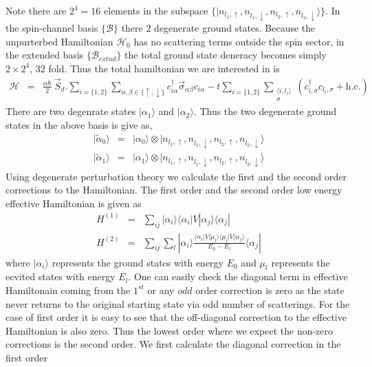 \documentclass[reprint,prb,superscriptaddress]{revtex4-1}
\begin{document}
Note there are $2^4=16$ elements in the subspace $\{|n_{l_1,\uparrow},n_{l_1,\downarrow},n_{l_2,\uparrow},n_{l_2,\downarrow}\rangle\}$. In the spin-channel basis $\{\mathcal{B}\}$ there $2$ degenerate ground states. Because the unpurterbed Hamiltonian $\mathcal{H}_0$ has no scattering terms outside the spin sector, in the extended basis $\{\mathcal{B}_{extnd}\}$ the total ground state deneracy becomes simply $2\times 2^4$, $32$ fold. Thus the total hamiltonian we are interested in is 
\begin{eqnarray}
\mathcal{H} &=& \frac{\alpha\hbar}{2}~ \vec{S}_d. \displaystyle\sum_{i=\{1,2\}} \displaystyle\sum_{\alpha,\beta\in\{\uparrow,\downarrow\}}c_{i\alpha}^{\dagger} \vec{\sigma}_{\alpha\beta} c_{i\alpha} -t\displaystyle\sum_{i=\{1,2\}}\displaystyle\sum_{\substack{\langle i,l_i \rangle\\ \sigma}}(c^{\dagger}_{i,\sigma} c_{l_i,\sigma}+ \textrm{h.c.}) 
\end{eqnarray}
There are two degenrate states $|\alpha_1\rangle$ and $|\alpha_2\rangle$. Thus the two degenerate ground states in the above basis is give as,
\begin{eqnarray}
|\tilde{\alpha}_0\rangle &=&| {\alpha}_0\rangle\otimes |n_{l_1,\uparrow},n_{l_1,\downarrow},n_{l_2,\uparrow},n_{l_2,\downarrow}\rangle \\
|\tilde{\alpha}_1\rangle &=& | {\alpha}_1\rangle\otimes |n_{l_1,\uparrow},n_{l_1,\downarrow},n_{l_2,\uparrow},n_{l_2,\downarrow}\rangle
\end{eqnarray}
Using degenerate perturbation theory we calculate the first and the second order corrections to the Hamiltonian. The first order and the second order low energy effective Hamiltonian is given as 
\begin{eqnarray}
H^{(1)} &=& \sum_{ij} |\alpha_i\rangle \langle \alpha_i  | V| \alpha_j \rangle \langle \alpha_j |~\nonumber\\
H^{(2)} &=& \sum_{ij} \sum_l |\alpha_i\rangle \frac{\langle \alpha_i  | V| \mu_l \rangle \langle \mu_l  | V| \alpha_j \rangle}{E_0-E_{l}}\langle \alpha_j |
\end{eqnarray}
where $|\alpha_i\rangle$ represents the ground states with energy $E_0$ and $\mu_l$ represents the ecvited states with energy $E_l$. One can easily check the diagonal term in effective Hamiltonain coming from the $1^{st}$ or any $odd$ order correction is zero as the state never returns to the original starting state via odd number of scatterings. For the case of first order it is easy to see that the off-diagonal correction to the effective Hamiltonian is also zero. Thus the lowest order where we expect the non-zero corrections is the second order. We first calculate the diagonal correction in the first order
\end{document}

